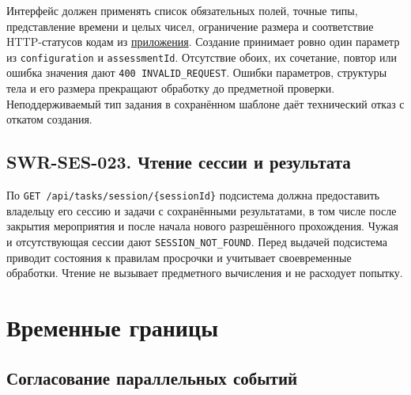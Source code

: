 \documentclass[12pt,a4paper]{article}
\begin{document}
\hypertarget{swr-ses-022-форматы-и-категории-api}{}

\hypertarget{swr-ses-022}{}

Интерфейс должен применять список обязательных полей, точные типы, представление времени и целых чисел, ограничение размера и соответствие HTTP-статусов кодам из {\hyperlink{doc-062-контракты-сессий-задач}{приложения}}. Создание принимает ровно один параметр из \texttt{configuration} и \texttt{assessmentId}. Отсутствие обоих, их сочетание, повтор или ошибка значения дают \texttt{400 INVALID\_\allowbreak{}REQUEST}. Ошибки параметров, структуры тела и его размера прекращают обработку до предметной проверки. Неподдерживаемый тип задания в сохранённом шаблоне даёт технический отказ с откатом создания.

\subsection{SWR-SES-023. Чтение сессии и результата}\label{swr-ses-023-ux447ux442ux435ux43dux438ux435-ux441ux435ux441ux441ux438ux438-ux438-ux440ux435ux437ux443ux43bux44cux442ux430ux442ux430}

\hypertarget{swr-ses-023-чтение-сессии-и-результата}{}

\hypertarget{swr-ses-023}{}

По \texttt{GET /\allowbreak{}api/\allowbreak{}tasks/\allowbreak{}session/\allowbreak{}\{sessionId\}} подсистема должна предоставить владельцу его сессию и задачи с сохранёнными результатами, в том числе после закрытия мероприятия и после начала нового разрешённого прохождения. Чужая и отсутствующая сессии дают \texttt{SESSION\_\allowbreak{}NOT\_\allowbreak{}FOUND}. Перед выдачей подсистема приводит состояния к правилам просрочки и учитывает своевременные обработки. Чтение не вызывает предметного вычисления и не расходует попытку.

\section{Временные границы}\label{5-ux432ux440ux435ux43cux435ux43dux43dux44bux435-ux433ux440ux430ux43dux438ux446ux44b}

\hypertarget{5-временные-границы}{}

\subsection{Согласование параллельных событий}\label{ux441ux43eux433ux43bux430ux441ux43eux432ux430ux43dux438ux435-ux43fux430ux440ux430ux43bux43bux435ux43bux44cux43dux44bux445-ux441ux43eux431ux44bux442ux438ux439}
\end{document}
